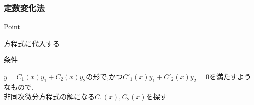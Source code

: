 \documentclass[a4paper]{jsarticle}
\begin{document}
\subsubsection{定数変化法}
\begin{itembox}[l]{Point}
    \begin{center}
        方程式に代入する
    \end{center}
\end{itembox}
\begin{itembox}[l]{条件}
    \begin{center}
        $y=C_1\left(x\right)y_1+C_2\left(x\right)y_2$の形で,かつ$C'_1\left(x\right)y_1+C'_2\left(x\right)y_2=0$を満たすようなもので,\\
        非同次微分方程式の解になる$C_1\left(x\right),C_2\left(x\right)$を探す
    \end{center}
\end{itembox}
\end{document}
